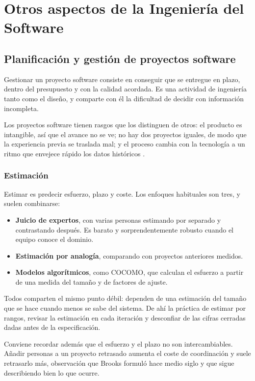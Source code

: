 \chapter{Otros aspectos de la Ingeniería del Software}

\section{Planificación y gestión de proyectos software}

Gestionar un proyecto software consiste en conseguir que se entregue en plazo,
dentro del presupuesto y con la calidad acordada. Es una actividad de ingeniería
tanto como el diseño, y comparte con él la dificultad de decidir con información
incompleta.

Los proyectos software tienen rasgos que los distinguen de otros: el producto es
intangible, así que el avance no se ve; no hay dos proyectos iguales, de modo que
la experiencia previa se traslada mal; y el proceso cambia con la tecnología a un
ritmo que envejece rápido los datos históricos \cite{sommerville2016}.

\subsection*{Estimación}

Estimar es predecir esfuerzo, plazo y coste. Los enfoques habituales son tres, y
suelen combinarse:

\begin{itemize}
    \item \textbf{Juicio de expertos}, con varias personas estimando por separado
          y contrastando después. Es barato y sorprendentemente robusto cuando el
          equipo conoce el dominio.
    \item \textbf{Estimación por analogía}, comparando con proyectos anteriores
          medidos.
    \item \textbf{Modelos algorítmicos}, como COCOMO, que calculan el esfuerzo a
          partir de una medida del tamaño y de factores de ajuste.
\end{itemize}

Todos comparten el mismo punto débil: dependen de una estimación del tamaño que se
hace cuando menos se sabe del sistema. De ahí la práctica de estimar por rangos,
revisar la estimación en cada iteración y desconfiar de las cifras cerradas dadas
antes de la especificación.

Conviene recordar además que el esfuerzo y el plazo no son intercambiables.
Añadir personas a un proyecto retrasado aumenta el coste de coordinación y suele
retrasarlo más, observación que Brooks formuló hace medio siglo y que sigue
describiendo bien lo que ocurre.

